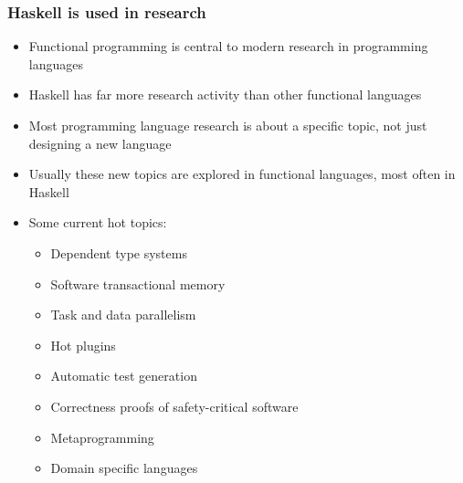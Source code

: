 \documentclass{beamer}
\begin{document}
\begin{frame}
\frametitle{Haskell is used in research}

\begin{itemize}
\item Functional programming is central to modern research in
  programming languages
\item Haskell has far more research activity than other functional
  languages
\item Most programming language research is about a specific topic,
  not just designing a new language
\item Usually these new topics are explored in functional
  languages, most often in Haskell
\item Some {\bluetext current hot topics:}
  \begin{itemize}
  \item Dependent type systems
  \item Software transactional memory
  \item Task and data parallelism
  \item Hot plugins
  \item Automatic test generation
  \item Correctness proofs of safety-critical software
  \item Metaprogramming
  \item Domain specific languages
  \end{itemize}
\end{itemize}

\end{frame}
\end{document}

